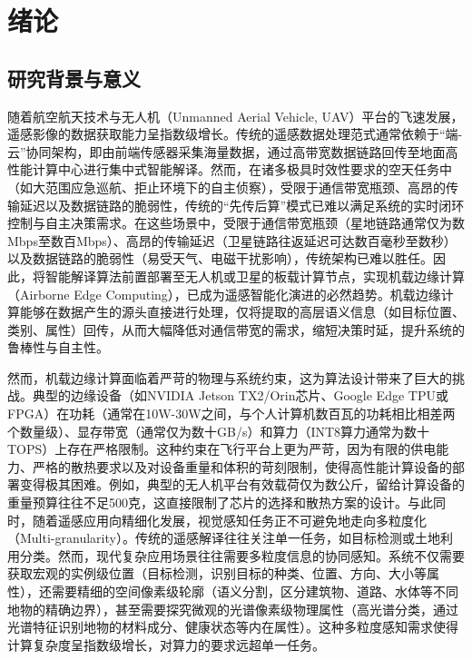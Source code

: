 \chapter{绪论}

\section{研究背景与意义}
随着航空航天技术与无人机（Unmanned Aerial Vehicle, UAV）平台的飞速发展，遥感影像的数据获取能力呈指数级增长\cite{zhu2017deep}。传统的遥感数据处理范式通常依赖于“端-云”协同架构，即由前端传感器采集海量数据，通过高带宽数据链路回传至地面高性能计算中心进行集中式智能解译。然而，在诸多极具时效性要求的空天任务中（如大范围应急巡航、拒止环境下的自主侦察），受限于通信带宽瓶颈、高昂的传输延迟以及数据链路的脆弱性，传统的“先传后算”模式已难以满足系统的实时闭环控制与自主决策需求\cite{shi2016edge}。在这些场景中，受限于通信带宽瓶颈（星地链路通常仅为数Mbps至数百Mbps）、高昂的传输延迟（卫星链路往返延迟可达数百毫秒至数秒）以及数据链路的脆弱性（易受天气、电磁干扰影响），传统架构已难以胜任\cite{zhang2020edge}。因此，将智能解译算法前置部署至无人机或卫星的板载计算节点，实现机载边缘计算（Airborne Edge Computing），已成为遥感智能化演进的必然趋势\cite{cheng2022comprehensive}。机载边缘计算能够在数据产生的源头直接进行处理，仅将提取的高层语义信息（如目标位置、类别、属性）回传，从而大幅降低对通信带宽的需求，缩短决策时延，提升系统的鲁棒性与自主性。

然而，机载边缘计算面临着严苛的物理与系统约束，这为算法设计带来了巨大的挑战。典型的边缘设备（如NVIDIA Jetson TX2/Orin芯片、Google Edge TPU或FPGA）在功耗（通常在10W-30W之间，与个人计算机数百瓦的功耗相比相差两个数量级）、显存带宽（通常仅为数十GB/s）和算力（INT8算力通常为数十TOPS）上存在严格限制\cite{chen2019deep}。这种约束在飞行平台上更为严苛，因为有限的供电能力、严格的散热要求以及对设备重量和体积的苛刻限制，使得高性能计算设备的部署变得极其困难。例如，典型的无人机平台有效载荷仅为数公斤，留给计算设备的重量预算往往不足500克，这直接限制了芯片的选择和散热方案的设计。与此同时，随着遥感应用向精细化发展，视觉感知任务正不可避免地走向多粒度化（Multi-granularity）。传统的遥感解译往往关注单一任务，如目标检测或土地利用分类。然而，现代复杂应用场景往往需要多粒度信息的协同感知。系统不仅需要获取宏观的实例级位置（目标检测，识别目标的种类、位置、方向、大小等属性），还需要精细的空间像素级轮廓（语义分割，区分建筑物、道路、水体等不同地物的精确边界），甚至需要探究微观的光谱像素级物理属性（高光谱分类，通过光谱特征识别地物的材料成分、健康状态等内在属性）。这种多粒度感知需求使得计算复杂度呈指数级增长，对算力的要求远超单一任务。

